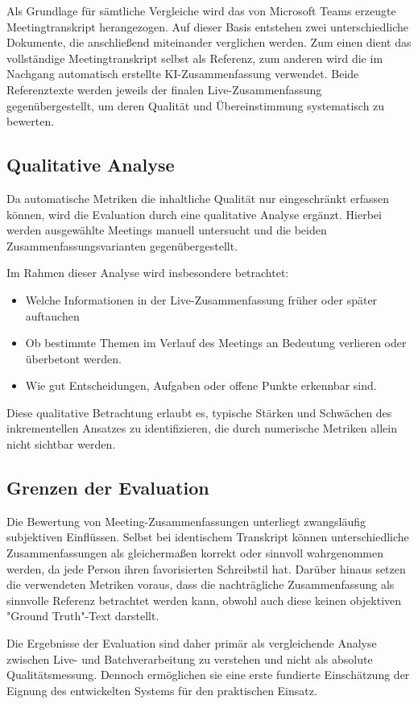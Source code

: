 Als Grundlage für sämtliche Vergleiche wird das von Microsoft Teams erzeugte Meetingtranskript herangezogen. Auf dieser Basis entstehen zwei unterschiedliche Dokumente, die anschließend miteinander verglichen werden. Zum einen dient das vollständige Meetingtranskript selbst als Referenz, zum anderen wird die im Nachgang automatisch erstellte KI-Zusammenfassung verwendet. Beide Referenztexte werden jeweils der finalen Live-Zusammenfassung gegenübergestellt, um deren Qualität und Übereinstimmung systematisch zu bewerten. 

\newpage
\subsection{Qualitative Analyse}
\label{qualitative Analyse}
Da automatische Metriken die inhaltliche Qualität nur eingeschränkt erfassen können, wird die Evaluation durch eine qualitative Analyse ergänzt. Hierbei werden ausgewählte Meetings manuell untersucht und die beiden Zusammenfassungsvarianten gegenübergestellt. 

Im Rahmen dieser Analyse wird insbesondere betrachtet: 
\begin{itemize}
    \item Welche Informationen in der Live-Zusammenfassung früher oder später auftauchen 
    \item Ob bestimmte Themen im Verlauf des Meetings an Bedeutung verlieren oder überbetont werden.
    \item Wie gut Entscheidungen, Aufgaben oder offene Punkte erkennbar sind. 
\end{itemize}

Diese qualitative Betrachtung erlaubt es, typische Stärken und Schwächen des inkrementellen Ansatzes zu identifizieren, die durch numerische Metriken allein nicht sichtbar werden. 

\subsection{Grenzen der Evaluation}
Die Bewertung von Meeting-Zusammenfassungen unterliegt zwangsläufig subjektiven Einflüssen. Selbst bei identischem Transkript können unterschiedliche Zusammenfassungen als gleichermaßen korrekt oder sinnvoll wahrgenommen werden, da jede Person ihren favorisierten Schreibstil hat. Darüber hinaus setzen die verwendeten Metriken voraus, dass die nachträgliche Zusammenfassung als sinnvolle Referenz betrachtet werden kann, obwohl auch diese keinen objektiven "Ground Truth"-Text darstellt. 

Die Ergebnisse der Evaluation sind daher primär als vergleichende Analyse zwischen Live- und Batchverarbeitung zu verstehen und nicht als absolute Qualitätsmessung. Dennoch ermöglichen sie eine erste fundierte Einschätzung der Eignung des entwickelten Systems für den praktischen Einsatz.
